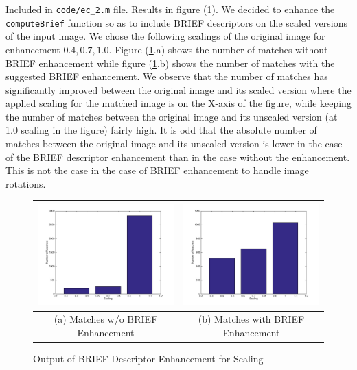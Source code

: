 \documentclass[12pt]{article}\sloppy
\begin{document}
Included in \texttt{code/ec\_2.m} file. Results in figure (\ref{fig:briefscalingenhancement}). We decided to enhance the \texttt{computeBrief} function so as to include BRIEF descriptors on the scaled versions of the input image. We chose the following scalings of the original image for enhancement $0.4, 0.7, 1.0$. Figure (\ref{fig:briefscalingenhancement}.a) shows the number of matches without BRIEF enhancement while figure (\ref{fig:briefscalingenhancement}.b) shows the number of matches with the suggested BRIEF enhancement. We observe that the number of matches has significantly improved between the original image and its scaled version where the applied scaling for the matched image is on the X-axis of the figure, while keeping the number of matches between the original image and its unscaled version (at 1.0 scaling in the figure) fairly high. It is odd that the absolute number of matches between the original image and its unscaled version is lower in the case of the BRIEF descriptor enhancement than in the case without the enhancement. This is not the case in the case of BRIEF enhancement to handle image rotations.

\begin{figure}[f]
\centering
\begin{tabular}{| c | c |}
  \hline
  \includegraphics[width=0.42\linewidth]{../results/EC2_ScalingError_1.jpg} & \includegraphics[width=0.42\linewidth]{../results/EC2_ScalingError_2.jpg} \\
  \hline
  (a) Matches w/o BRIEF Enhancement & (b) Matches with BRIEF Enhancement \\
  \hline
\end{tabular}
\caption{Output of BRIEF Descriptor Enhancement for Scaling}
\label{fig:briefscalingenhancement}
\end{figure}
\end{document}
